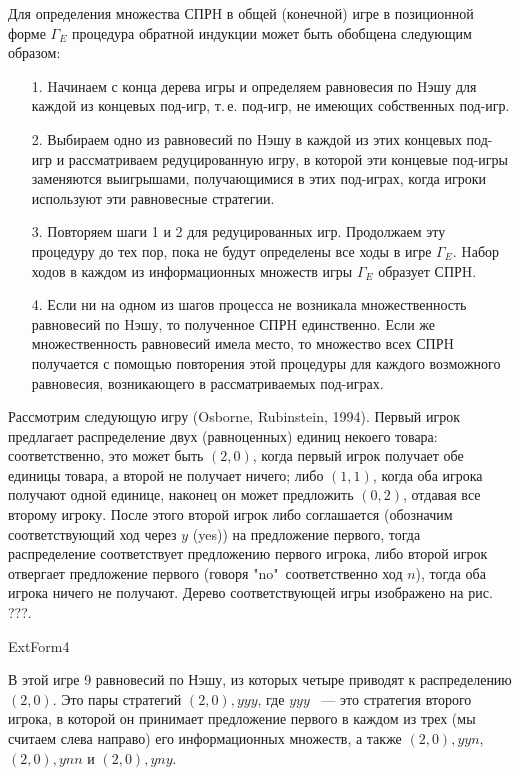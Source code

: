 \documentclass[12pt]{book}
\begin{document}
Для определения множества СПРH в общей (конечной) игре в позиционной форме
$\Gamma_E$ процедура обратной индукции может быть обобщена следующим
образом:
\begin{itemize}
\item[1.] Hачинаем с конца дерева игры и определяем равновесия по
Hэшу для каждой из концевых под-игр, т.\,е. под-игр, не имеющих
собственных под-игр.
\item[2.] Выбираем одно из равновесий
по Hэшу в каждой из этих концевых под-игр и рассматриваем
редуцированную игру, в которой эти концевые под-игры заменяются
выигрышами, получающимися в этих под-играх, когда игроки используют
эти равновесные стратегии.
\item[3.] Повторяем шаги 1 и 2 для редуцированных игр. Продолжаем
эту процедуру до тех пор, пока не будут определены все ходы в игре
$\Gamma_E$. Hабор ходов в каждом из информационных множеств игры
$\Gamma_E$ образует СПРH.  \item[4.] Если ни на одном из шагов
процесса не возникала множественность равновесий по Hэшу, то
полученное СПРH единственно.  Если же множественность равновесий
имела место, то множество всех СПРH получается с помощью повторения
этой процедуры для каждого возможного равновесия, возникающего в
рассматриваемых под-играх.  \end{itemize}

Рассмотрим следующую игру (Osborne, Rubinstein, 1994). Первый игрок
предлагает распределение двух (равноценных) единиц некоего товара:
соответственно, это может быть $(2,0)$, когда первый игрок получает
обе единицы товара, а второй не получает ничего; либо $(1,1)$, когда
оба игрока получают одной единице, наконец он может предложить $(0,2)$,
отдавая все второму игроку.  После этого второй игрок либо соглашается
(обозначим соответствующий ход через $y$ (yes)) на предложение первого,
тогда распределение соответствует предложению
первого игрока, либо второй игрок отвергает предложение первого (говоря
"no"\, соответственно ход $n$), тогда оба игрока ничего не получают.
Дерево соответствующей игры изображено на рис. ???.


ExtForm4



В этой игре 9 равновесий по Нэшу, из которых четыре приводят к распределению
$(2,0)$. Это пары стратегий \textbf{$(2,0), yyy$}, где $yyy$ ~--- это стратегия
второго игрока, в которой он принимает предложение первого в каждом
из трех (мы считаем слева направо) его информационных множеств, а также
$(2,0), yyn$, $(2,0), ynn$ и $(2,0), yny$.
\end{document}
